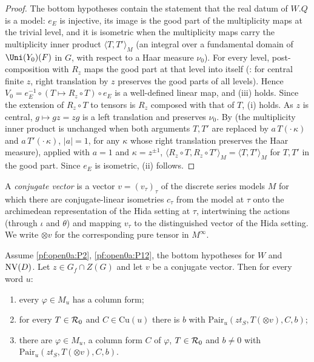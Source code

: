 \begin{proof}
The bottom hypotheses contain the statement that the real datum of $W.Q$ is a model: $e_E$ is injective, its image is
the good part of the multiplicity maps at the trivial level, and it is isometric when the multiplicity maps carry the
multiplicity inner product $\langle T,T'\rangle_M$ (an integral over a fundamental domain of $\Uni(Y_0)(F)$ in $G$,
with respect to a Haar measure $\nu_0$). For every level, post-composition with $R_z$ maps the good part at that level
into itself (: for central finite $z$,
right translation by $z$ preserves the good parts of all levels). Hence
$V_0=e_E^{-1}\circ(T\mapsto R_z\circ T)\circ e_E$ is a well-defined linear map, and (iii) holds. Since the extension of
$R_z\circ T$ to tensors is $R_z$ composed with that of $T$, (i) holds. As $z$ is central, $g\mapsto gz=zg$ is a left
translation and preserves $\nu_0$. By  (the
multiplicity inner product is unchanged when both arguments $T,T'$ are replaced by $a\,T(\cdot\,\kappa)$ and
$a\,T'(\cdot\,\kappa)$, $|a|=1$, for any $\kappa$ whose right translation preserves the Haar measure), applied with $a=1$
and $\kappa=z^{\pm1}$, $\langle R_z\circ T,R_z\circ T'\rangle_M=\langle T,T'\rangle_M$ for $T,T'$ in the good part.
Since $e_E$ is isometric, (ii) follows.
\end{proof}

A \emph{conjugate vector} is a vector $v=(v_\tau)_\tau$ of the discrete series models $M$ for which there are
conjugate-linear isometries $c_\tau$ from the model at $\tau$ onto the archimedean representation of the Hida setting
at $\tau$, intertwining the actions (through $\iota$ and $\theta$) and mapping $v_\tau$ to the distinguished vector of
the Hida setting. We write $\otimes v$ for the corresponding pure tensor in $M^{\infty}$.

\begin{lemma}\label{pf:open0a:anchorpairs}
Assume \ref{pf:open0a:P2}, \ref{pf:open0a:P12}, the bottom hypotheses for $W$ and $\mathrm{NV}(D)$. Let
$z\in G_f\cap Z(G)$ and let $v$ be a conjugate vector. Then for every word $u$:
\begin{enumerate}[label=(\alph*)]
\item every $\varphi\in M_u$ has a column form;
\item for every $T\in\mathcal{R}_0$ and $C\in\mathrm{Cu}(u)$ there is $b$ with $\mathrm{Pair}_u(zt_S,T(\otimes v),C,b)$;
\item there are $\varphi\in M_u$, a column form $C$ of $\varphi$, $T\in\mathcal{R}_0$ and $b\ne0$ with
$\mathrm{Pair}_u(zt_S,T(\otimes v),C,b)$.
\end{enumerate}
\ 
\end{lemma}

